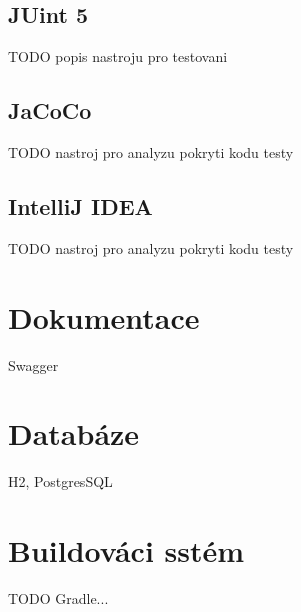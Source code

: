     \subsection{JUint 5}
    TODO popis nastroju pro testovani
    \subsection{JaCoCo}\label{resere:testovani:jacoco}
    TODO nastroj pro analyzu pokryti kodu testy \cite{JoCoCo}
    \subsection{IntelliJ IDEA}\label{resere:testovani:intellij-idea}
    TODO nastroj pro analyzu pokryti kodu testy \cite{intellij-idea-code-coverage}

\section{Dokumentace}\label{resere:dokumentace}
    Swagger
\section{Databáze}\label{resere:databaze}
    H2, PostgresSQL
\section{Buildováci sstém}\label{resere:build}
    TODO Gradle...
